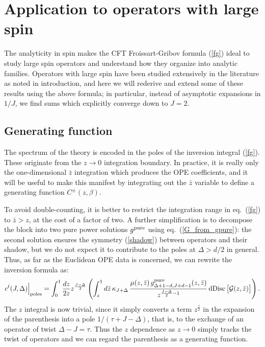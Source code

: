 \documentclass[11pt, reqno,preprint]{article}
\def\be{\begin{equation}}
\def\ee{\end{equation}}
\def\dDisc{{\rm dDisc}\,}
\def\gpure{g^{\rm pure}}
\def\zbar{\bar{z}}
\def\j{J}
\def\GG{\mathcal{G}}
\begin{document}
\section{Application to operators with large spin} \label{sec:spin}

The analyticity in spin makes the CFT Froissart-Gribov formula (\ref{fg}) ideal to study
large spin operators and understand how they organize into analytic families.
Operators with large spin have been studied extensively in the literature as noted in introduction,
and here we will rederive and extend some of these results
using the above formula; in particular, instead of asymptotic expansions in $1/\j$, we find
sums which explicitly converge down to $\j=2$.

\subsection{Generating function}

The spectrum of the theory is encoded in the poles of the inversion
integral (\ref{fg}). These originate from the $z\to 0$ integration boundary.
In practice, it is really only the one-dimensional $\zbar$ integration which produces the OPE coefficients,
and it will be useful to make this manifest by integrating out the $\zbar$ variable
to define a generating function $C^\pm(z,\beta)$.

To avoid double-counting,
it is better to restrict the integration range in eq.~(\ref{fg}) to $\zbar>z$, at the cost of a factor of two. 
A further simplification is to decompose the block
into two pure power solutions $\gpure$ using eq.~(\ref{G_from_gpure}): the second solution ensures the symmetry (\ref{shadow})
between operators and their shadow, but we do not expect it
to contribute to the poles at $\Delta>d/2$ in general.  Thus, as far as the Euclidean
OPE data is concerned, we can rewrite the inversion formula as:
\be
c^t(\j,\Delta)\Big|_{\rm poles}=
\int_0^1 \frac{dz}{2z} z^{\frac{\j-\Delta}{2}}\left(
\int_z^1 d\zbar\,\kappa_{\j+\Delta}\,\frac{\mu(z,\zbar)\, \gpure_{\Delta+1-d,\j+d-1}(z,\zbar)}{z^{\frac{\j-\Delta}{2}-1}}
\,\dDisc\big[\GG(z,\zbar)\big]\right). \label{C_gen}
\ee
The $z$ integral is now trivial, since it simply converts 
a term $z^{\frac{\tau}{2}}$ in the expansion of the parenthesis into a pole
$1/(\tau+\j-\Delta)$, that is, to the exchange of an operator of twist $\Delta-\j=\tau$.
Thus the $z$ dependence as $z\to 0$ simply tracks the twist of operators
and we can regard the parenthesis as a generating function.
\end{document}
